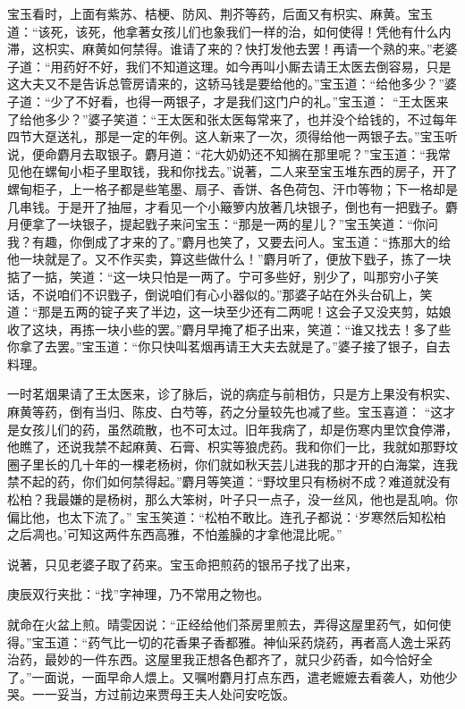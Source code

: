 \begin{parag}


    宝玉看时，上面有紫苏、桔梗、防风、荆芥等药，后面又有枳实、麻黄。宝玉道：“该死，该死，他拿著女孩儿们也象我们一样的治，如何使得！凭他有什么内滞，这枳实、麻黄如何禁得。谁请了来的？快打发他去罢！再请一个熟的来。”老婆子道：“用药好不好，我们不知道这理。如今再叫小厮去请王太医去倒容易，只是这大夫又不是告诉总管房请来的，这轿马钱是要给他的。”宝玉道：“给他多少？”婆子道：“少了不好看，也得一两银子，才是我们这门户的礼。”宝玉道： “王太医来了给他多少？”婆子笑道：“王太医和张太医每常来了，也并没个给钱的，不过每年四节大趸送礼，那是一定的年例。这人新来了一次，须得给他一两银子去。”宝玉听说，便命麝月去取银子。麝月道：“花大奶奶还不知搁在那里呢？”宝玉道：“我常见他在螺甸小柜子里取钱，我和你找去。”说著，二人来至宝玉堆东西的房子，开了螺甸柜子，上一格子都是些笔墨、扇子、香饼、各色荷包、汗巾等物；下一格却是几串钱。于是开了抽屉，才看见一个小簸箩内放著几块银子，倒也有一把戥子。麝月便拿了一块银子，提起戥子来问宝玉：“那是一两的星儿？”宝玉笑道：“你问我？有趣，你倒成了才来的了。”麝月也笑了，又要去问人。宝玉道：“拣那大的给他一块就是了。又不作买卖，算这些做什么！”麝月听了，便放下戥子，拣了一块掂了一掂，笑道：“这一块只怕是一两了。宁可多些好，别少了，叫那穷小子笑话，不说咱们不识戥子，倒说咱们有心小器似的。”那婆子站在外头台矶上，笑道：“那是五两的锭子夹了半边，这一块至少还有二两呢！这会子又没夹剪，姑娘收了这块，再拣一块小些的罢。”麝月早掩了柜子出来，笑道：“谁又找去！多了些你拿了去罢。”宝玉道：“你只快叫茗烟再请王大夫去就是了。”婆子接了银子，自去料理。
\end{parag}


\begin{parag}


    一时茗烟果请了王太医来，诊了脉后，说的病症与前相仿，只是方上果没有枳实、麻黄等药，倒有当归、陈皮、白芍等，药之分量较先也减了些。宝玉喜道： “这才是女孩儿们的药，虽然疏散，也不可太过。旧年我病了，却是伤寒内里饮食停滞，他瞧了，还说我禁不起麻黄、石膏、枳实等狼虎药。我和你们一比，我就如那野坟圈子里长的几十年的一棵老杨树，你们就如秋天芸儿进我的那才开的白海棠，连我禁不起的药，你们如何禁得起。”麝月等笑道：“野坟里只有杨树不成？难道就没有松柏？我最嫌的是杨树，那么大笨树，叶子只一点子，没一丝风，他也是乱响。你偏比他，也太下流了。” 宝玉笑道：“松柏不敢比。连孔子都说：‘岁寒然后知松柏之后凋也。’可知这两件东西高雅，不怕羞臊的才拿他混比呢。”
\end{parag}


\begin{parag}


    说著，只见老婆子取了药来。宝玉命把煎药的银吊子找了出来，\begin{note}庚辰双行夹批：“找”字神理，乃不常用之物也。\end{note}就命在火盆上煎。晴雯因说：“正经给他们茶房里煎去，弄得这屋里药气，如何使得。”宝玉道：“药气比一切的花香果子香都雅。神仙采药烧药，再者高人逸士采药治药，最妙的一件东西。这屋里我正想各色都齐了，就只少药香，如今恰好全了。”一面说，一面早命人煨上。又嘱咐麝月打点东西，遣老嬷嬷去看袭人，劝他少哭。一一妥当，方过前边来贾母王夫人处问安吃饭。
\end{parag}


